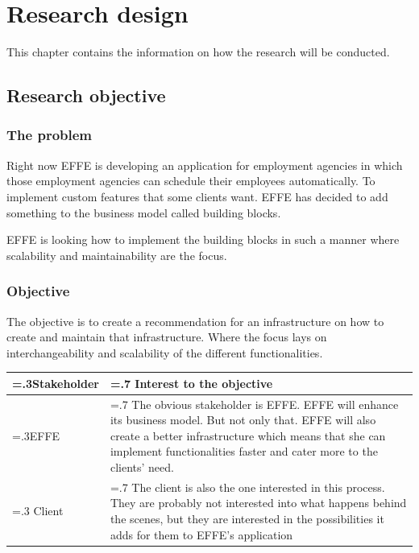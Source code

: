 
\chapter{Research design}
This chapter contains the information on how the research will be conducted.

\section{Research objective}

\subsection{The problem}
\label{sec:TheProblem}

Right now EFFE is developing an application for employment agencies in which those employment agencies can schedule their employees automatically. To implement custom features that some clients want. EFFE has decided to add something to the business model called building blocks.


EFFE is looking how to implement the building blocks in such a manner where scalability and maintainability are the focus.

\subsection{Objective}
The objective is to create a recommendation for an infrastructure on how to create and maintain that infrastructure. Where the focus lays on interchangeability and scalability of the different functionalities.

\begin{tabularx}{\linewidth}{|>{\hsize=.3\hsize}X|>{\hsize=.7\hsize}X|}
	\hline
	Stakeholder &
	Interest to the objective
	\\
	\hline
	EFFE &
	The obvious stakeholder is EFFE. EFFE will enhance its business model. But not only that. EFFE will also create a better infrastructure which means that she can implement functionalities faster and cater more to the clients’ need.
	\\
	\hline
	Client &
	The client is also the one interested in this process. They are probably not interested into what happens behind the scenes, but they are interested in the possibilities it adds for them to EFFE’s application
	\\
	\hline
\end{tabularx}

